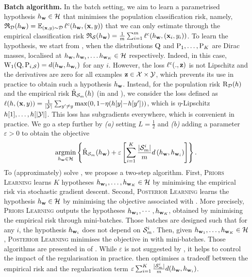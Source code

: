 \textbf{Batch algorithm.} In the batch setting, we aim to learn a parametrised hypothesis $h_{\wbf}\in\H$ that minimises the population classification risk, namely,  $\Rfrak_{\D}(h_{\wbf}) = \EE_{(\x, y)\sim\D}\loss^{c}(h_{\wbf}, (\x, y))$ that we can only estimate through the empirical classification risk $\Rfrak_{\S}(h_{\wbf}) = \frac{1}{m}\sum_{i=1}^{m}\loss^{c}(h_{\wbf}, (\x_i, y_i))$.
To learn the hypothesis, we start from , when the distributions $\Q$ and $\P_1,\dots, \P_K$ are Dirac masses, localised at $h_{\wbf}, h_{\wbf_1},\dots h_{\wbf_K}\in\H$ respectively.
Indeed, in this case, $\W_{1}(\Q, \P_{i,\S}) = d(h_{\wbf}, h_{\wbf_i})$ for any $i$.
However, the loss $\loss^{c}(.,\z)$ is not Lipschitz and the derivatives are zero for all examples $\z\in\X\times\Y$, which prevents its use in practice to obtain such a hypothesis $h_{\wbf}$.
Instead, for the population risk $\Risk_{\D}(h)$ and the empirical risk $\Riskhat_{\Sm}(h)$ (in  and ), we consider the loss defined as $\loss(h, (\x, y)) = \frac{1}{|\Y|}\sum_{y'\ne y} \max(0, 1{-} \eta(h[y]{-}h[y']))$, which is $\eta$-Lipschitz \wrt $h[1],\dots, h[|\Y|]$.
This loss has subgradients everywhere, which is convenient in practice.
We go a step further by {\it (a)}  setting $L=\frac{1}{2}$ and {\it (b)} adding a parameter $\varepsilon>0$ to obtain the objective
\begin{align}
    \label{eq:batch-alg-exp}
    \argmin_{h_{\wbf}\in\Hcal}\left\{ \Riskhat_{\Sm}(h_{\wbf}) + \varepsilon\LB\sum_{i=1}^{K} \frac{|\Sm^{i}|}{m} d\LP h_\wbf,h_{\wbf_i}\RP\RB\right\}.
\end{align}
To (approximately) solve , we propose a two-step algorithm.
First, \textsc{Priors Learning} learns $K$ hypotheses $h_{\wbf_1}, \dots, h_{\wbf_K} \in \H$ by minimising the empirical risk via stochastic gradient descent.
Second, \textsc{Posterior Learning} learns the hypothesis $h_{\wbf}\in\H$ by minimising the objective associated with .
More precisely, \textsc{Priors Learning} outputs the hypotheses $h_{\wbf_1},\cdots,h_{\wbf_K}$, obtained by minimising the empirical risk through mini-batches.
Those batches are designed such that for any $i$, the hypothesis $h_{\wbf_i}$ does not depend on $\Sm^{i}$.
Then, given $h_{\wbf_1}, \dots, h_{\wbf_K} \in \H$, \textsc{Posterior Learning} minimises the objective in  with mini-batches.
Those algorithms are presented in  of .
While $\varepsilon$ is not suggested by , it helps to control the impact of the regularisation in practice.
 then optimises a tradeoff between the empirical risk and the regularisation term $\varepsilon\sum_{i=1}^{K} \frac{|\Sm^{i}|}{m} d(h_{\wbf}, h_{\wbf_i})$.

